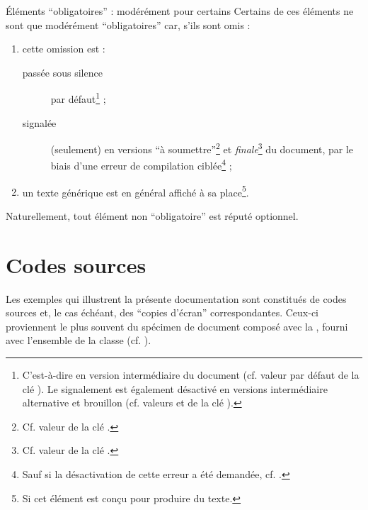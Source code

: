 \begin{dbremark}{Éléments \enquote{obligatoires} : modérément pour certains}{}
  Certains de ces éléments ne sont que modérément \enquote{obligatoires} car,
  s'ils sont omis :
  \begin{enumerate}
  \item cette omission est :
    \begin{description}
    \item[passée sous silence] par défaut\footnote{C'est-à-dire en version
        intermédiaire du document (cf. valeur par défaut 
        de la clé ). Le signalement est également désactivé en
        versions intermédiaire alternative et brouillon (cf. valeurs
         et  de la clé
        ).} ;
    \item[signalée] (seulement) en versions \enquote{à
        soumettre}\footnote{Cf. valeur  de la clé
        .} et \emph{finale}\footnote{Cf. valeur 
        de la clé .} du document, par le biais d'une erreur de
      compilation
      ciblée\footnote{Sauf si la désactivation de cette erreur a été demandée,
        cf. %
        .} ;
    \end{description}
  \item un texte générique est en général affiché à sa place\footnote{Si cet
      élément est conçu pour produire du texte.}.
  \end{enumerate}
\end{dbremark}

Naturellement, tout élément non \enquote{obligatoire} est réputé optionnel.

\section{Codes sources}
\label{sec-codes-sources}
%

Les exemples qui illustrent la présente documentation sont constitués de codes
sources et, le cas échéant, des \enquote{copies d'écran} correspondantes.
Ceux-ci proviennent le plus souvent du spécimen de document composé avec la
\yatCl{}, fourni avec l'ensemble de la classe
(cf. ).

